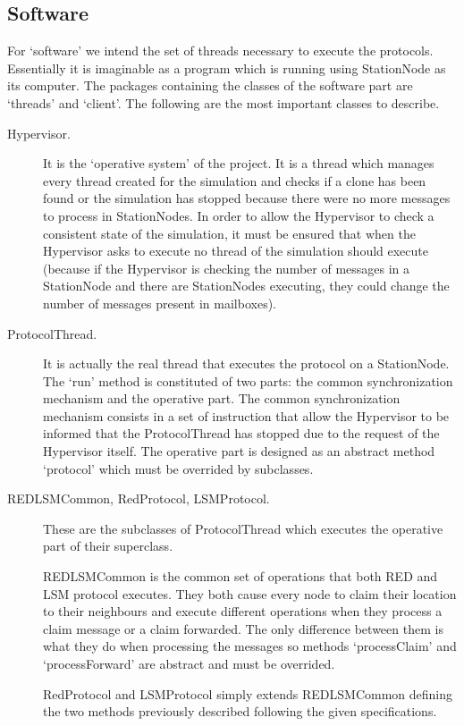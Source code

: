 \subsection{Software}
For `software' we intend the set of threads necessary to execute the protocols.
Essentially it is imaginable as a program which is running using StationNode
as its computer. The packages containing the classes of the software part are
`threads' and `client'. The following are the most important classes to 
describe.
\begin{description}
  \item[Hypervisor.] It is the `operative system' of the project. It is a 
  thread which manages every thread created for the simulation and checks 
  if a clone has been found or the simulation has stopped because there were
  no more messages to process in StationNodes. In order to allow the Hypervisor
  to check a consistent state of the simulation, it must be ensured that when
  the Hypervisor asks to execute no thread of the simulation should execute 
  (because if the Hypervisor is checking the number of messages in a 
  StationNode and there are StationNodes executing, they could change the number
  of messages present in mailboxes).
  \item[ProtocolThread.] It is actually the real thread that executes the
  protocol on a StationNode. The `run' method is constituted of two parts: the
  common synchronization mechanism and the operative part. The common 
  synchronization mechanism consists in a set of instruction that allow the 
  Hypervisor to be informed that the ProtocolThread has stopped due to the 
  request of the Hypervisor itself. The operative part is designed as an abstract 
  method `protocol' which must be overrided by subclasses.
  \item[REDLSMCommon, RedProtocol, LSMProtocol.] These are the subclasses of
  ProtocolThread which executes the operative part of their superclass.
  
  REDLSMCommon is the common set of operations that both RED and LSM protocol
  executes. They both cause every node to claim their location to their
  neighbours and execute different operations when they process a claim message
  or a claim forwarded. The only difference between them is what they do when
  processing the messages so methods `processClaim' and `processForward' are
  abstract and must be overrided.
  
  RedProtocol and LSMProtocol simply extends REDLSMCommon defining the two
  methods previously described following the given specifications.
  

\end{description}
